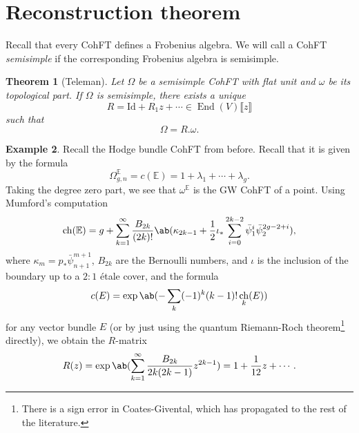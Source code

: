\documentclass{amsart}
\newtheorem{thm}{Theorem}[section]
\theoremstyle{definition}
\newtheorem{exm}[thm]{Example}
\theoremstyle{remark}
\theoremstyle{plain}
\theoremstyle{definition}
\theoremstyle{remark}
\newcommand{\E}{\mathbb{E}}
\newcommand{\mr}[1]{\mathrm{#1}}
\newcommand{\1}{\mathbf{1}}
\newcommand{\2}{\mathbf{2}}
\newcommand{\3}{\mathbf{3}}
\newcommand{\ps}[1]{\llbracket #1 \rrbracket}
\DeclareMathOperator{\End}{End}
\DeclareMathOperator{\ch}{ch}
\begin{document}
\section{Reconstruction theorem}%
\label{sec:Reconstruction theorem}

Recall that every CohFT defines a Frobenius algebra. We will call a CohFT \textit{semisimple} if the corresponding Frobenius algebra is semisimple.

\begin{thm}[Teleman]
    Let $\Omega$ be a semisimple CohFT with flat unit and $\omega$ be its topological part. If $\Omega$ is semisimple, there exists a unique 
    \[ R = \mr{Id} + R_1 z + \cdots \in \End(V)\ps{z} \]
    such that
    \[ \Omega = R.\omega. \]
\end{thm}

\begin{exm}
    Recall the Hodge bundle CohFT from before. Recall that it is given by the formula
    \[ \Omega^{\E}_{g,n} = c(\E) = 1 + \lambda_1 + \cdots + \lambda_g. \]
    Taking the degree zero part, we see that $\omega^{\E}$ is the GW CohFT of a point. Using Mumford's computation
    \[ \ch(\E) = g + \sum_{k=1}^{\infty} \frac{B_{2k}}{(2k)!}\ab(\kappa_{2k-1} + \frac{1}{2}\iota_*\sum_{i=0}^{2k-2} \bar{\psi}_1^{i} \bar{\psi}_2^{2g-2+i}), \]
    where $\kappa_{m} = p_* \bar{\psi}_{n+1}^{m+1}$, $B_{2k}$ are the Bernoulli numbers, and $\iota$ is the inclusion of the boundary up to a $2:1$ \'etale cover, and the formula
    \[ c(E) = \exp \ab(-\sum_k (-1)^k (k-1)!\ch_k(E)) \]
    for any vector bundle $E$ (or by just using the quantum Riemann-Roch theorem\footnote{There is a sign error in Coates-Givental, which has propagated to the rest of the literature.} directly), we obtain the $R$-matrix
    \[ R(z) = \exp\ab( \sum_{k=1}^{\infty} \frac{B_{2k}}{2k(2k-1)} z^{2k-1}) = 1+\frac{1}{12}z + \cdots. \]


\end{exm}
\end{document}
